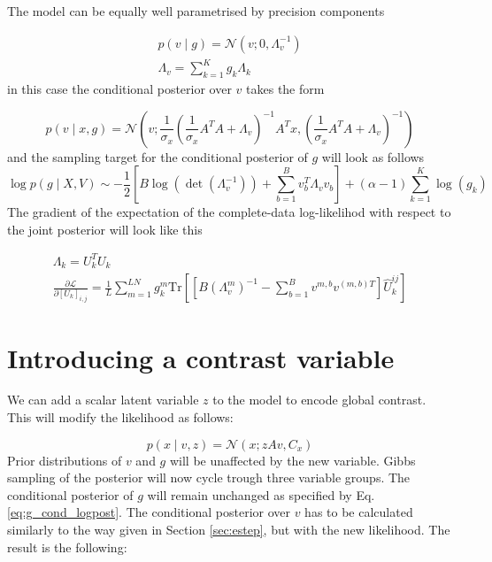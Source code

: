 \documentclass{paper}
\begin{document}
The model can be equally well parametrised by precision components

\begin{eqnarray}
p(v \mid g) = \mathcal{N}(v; 0,\Lambda_v^{-1}) \\
\Lambda_v = \sum_{k=1}^K g_k \Lambda_k \label{eq:cv}
\end{eqnarray}
%
in this case the conditional posterior over $v$ takes the form

\begin{equation}
p(v \mid x,g) = \mathcal{N}\left(v; \frac{1}{\sigma_x} \left(\frac{1}{\sigma_x} A^T A + \Lambda_v \right)^{-1} A^T x, \left(\frac{1}{\sigma_x} A^T A + \Lambda_v\right)^{-1}\right)
\end{equation}
%
and the sampling target for the conditional posterior of $g$ will look as follows
\begin{equation} 
\log p(g \mid X,V) \sim -\frac{1}{2} \left[B\log(\det(\Lambda_v^{-1})) + \sum_{b=1}^B v_b^T \Lambda_v v_b\right] + (\alpha-1) \sum_{k=1}^K \log(g_k)
\end{equation}
%
The gradient of the expectation of the complete-data log-likelihod with respect to the joint posterior will look like this

\begin{eqnarray}
\Lambda_k = U_k^T U_k \\
\frac{\partial \mathcal{L}}{\partial \left[ U_k \right]_{i,j}} = \frac{1}{L} \sum_{m=1}^{LN} g_k^{m} \textrm{Tr} \left[ \left[ B  \left( \Lambda_v^m \right)^{-1} - \sum_{b=1}^B v^{m,b} v^{(m,b)T} \right] \hat U_k^{ij} \right]
\end{eqnarray}


\section{Introducing a contrast variable}

We can add a scalar latent variable $z$ to the model to encode global contrast. This will modify the likelihood as follows:

\begin{equation}
p(x \mid v,z) = \mathcal{N}(x; zAv,C_x)
\end{equation}
%
Prior distributions of $v$ and $g$ will be unaffected by the new variable. Gibbs sampling of the posterior will now cycle trough three variable groups. The conditional posterior of $g$ will remain unchanged as specified by Eq. \ref{eq:g_cond_logpost}. The conditional posterior over $v$ has to be calculated similarly to the way given in Section \ref{sec:estep}, but with the new likelihood. The result is the following:
\end{document}
